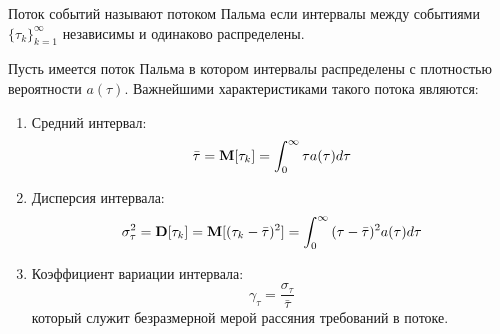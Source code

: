 \begin{definition}
	Поток событий называют {\color{red}потоком Пальма} если интервалы между событиями $\{\tau_k\}_{k=1}^\infty$ независимы и одинаково распределены.
\end{definition}

Пусть имеется поток Пальма в котором интервалы распределены с плотностью вероятности $a(\tau)$. Важнейшими характеристиками такого потока являются:
\begin{enumerate}
	\item Средний интервал: 
	$$\bar{\tau} = \mathbf{M}[\tau_k] = \int_0^\infty{\tau a(\tau) d\tau}$$
	\item Дисперсия интервала:
	$$\sigma^2_\tau = \mathbf{D}[\tau_k] = \mathbf{M}[(\tau_k - \bar{\tau})^2] = \int_0^\infty {(\tau - \bar{\tau})^2 a(\tau) d\tau}$$  
	\item Коэффициент вариации интервала:
	$$\gamma_\tau = \frac{\sigma_\tau}{\bar{\tau}}$$
	который служит безразмерной мерой рассяния требований в потоке.
\end{enumerate}